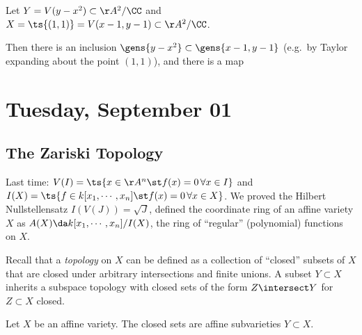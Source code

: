\begin{example}

Let \(Y = V(y-x^2) \subset \AA^2/\CC\) and
\(X = \ts{(1, 1)} = V(x-1, y-1)\subset \AA^2/\CC\).

Then there is an inclusion \(\gens{y-x^2} \subset \gens{x-1, y-1}\)
(e.g.~by Taylor expanding about the point \((1, 1)\)), and there is a
map

\begin{center}
\end{center}

\end{example}

\hypertarget{tuesday-september-01}{%
\section{Tuesday, September 01}\label{tuesday-september-01}}

\hypertarget{the-zariski-topology}{%
\subsection{The Zariski Topology}\label{the-zariski-topology}}

Last time: \(V(I) = \ts{x\in \AA^n \st f(x) = 0 \, \forall x\in I}\) and
\(I(X) = \ts{f\in k[x_1, \cdots, x_n] \st f(x) = 0\, \forall x\in X}\).
We proved the Hilbert Nullstellensatz \(I(V(J)) = \sqrt{J}\), defined
the coordinate ring of an affine variety \(X\) as
\(A(X) \da k[x_1, \cdots, x_n] / I(X)\), the ring of ``regular''
(polynomial) functions on \(X\).

Recall that a \emph{topology} on \(X\) can be defined as a collection of
``closed'' subsets of \(X\) that are closed under arbitrary
intersections and finite unions. A subset \(Y\subset X\) inherits a
subspace topology with closed sets of the form \(Z\intersect Y\) for
\(Z\subset X\) closed.

\begin{definition}

Let \(X\) be an affine variety. The closed sets are affine subvarieties
\(Y\subset X\).

\end{definition}

